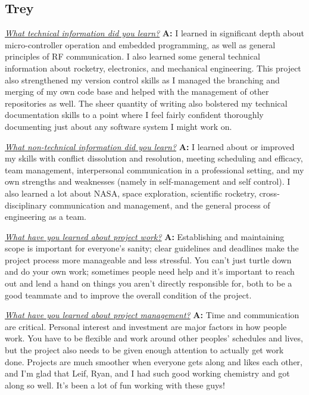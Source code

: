 \documentclass[onecolumn, draftclsnofoot, 10pt, compsoc]{IEEEtran}
\begin{document}
\subsection{Trey}
\textit{\underline{What technical information did you learn?}}
\newline\textbf{A:}  I learned in significant depth about micro-controller operation and embedded programming, as well as general principles of RF communication. I also learned some general technical information about rocketry, electronics, and mechanical engineering. This project also strengthened my version control skills as I managed the branching and merging of my own code base and helped with the management of other repositories as well. The sheer quantity of writing also bolstered my technical documentation skills to a point where I feel fairly confident thoroughly documenting just about any software system I might work on. \newline

\textit{\underline{What non-technical information did you learn?}}
\newline\textbf{A:} I learned about or improved my skills with conflict dissolution and resolution, meeting scheduling and efficacy, team management, interpersonal communication in a professional setting, and my own strengths and weaknesses (namely in self-management and self control). I also learned a lot about NASA, space exploration, scientific rocketry, cross-disciplinary communication and management, and the general process of engineering as a team. \newline 

\textit{\underline{What have you learned about project work?}}
\newline\textbf{A:} Establishing and maintaining scope is important for everyone's sanity; clear guidelines and deadlines make the project process more manageable and less stressful. You can't just turtle down and do your own work; sometimes people need help and it's important to reach out and lend a hand on things you aren't directly responsible for, both to be a good teammate and to improve the overall condition of the project.\newline 

\textit{\underline{What have you learned about project management?}}
\newline\textbf{A:}  Time and communication are critical. Personal interest and investment are major factors in how people work. You have to be flexible and work around other peoples' schedules and lives, but the project also needs to be given enough attention to actually get work done. Projects are much smoother when everyone gets along and likes each other, and I'm glad that Leif, Ryan, and I had such good working chemistry and got along so well. It's been a lot of fun working with these guys! \newline 
\end{document}

